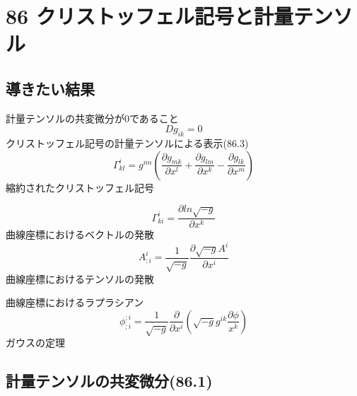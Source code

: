 \documentclass{jsarticle}
\begin{document}
\section{86 クリストッフェル記号と計量テンソル}

\subsection{導きたい結果}

計量テンソルの共変微分が0であること
\begin{equation}
    Dg_{ik} = 0 \label{eq:Dg}
\end{equation}
クリストッフェル記号の計量テンソルによる表示(86.3)
\begin{equation}
    \Gamma^{i}_{kl} =
    g^{im} 
    \left(
    \frac{\partial{g_{mk}}}{\partial{x^{l}}}
     +
    \frac{\partial{g_{lm}}}{\partial{x^{k}}}
     -
    \frac{\partial{g_{lk}}}{\partial{x^{m}}}
    \right)
\end{equation}
縮約されたクリストッフェル記号

\begin{equation}
    \Gamma^{i}_{ki} =
    \frac{\partial{ln\sqrt{-g}}}{\partial{x^{k}}}
\end{equation}
曲線座標におけるベクトルの発散
\begin{equation}
    A^{i}_{;i} = 
    \frac{1}{\sqrt{-g}}\frac{\partial \sqrt{-g}A^{i}}{\partial{x^{i}}}
\end{equation}
曲線座標におけるテンソルの発散


曲線座標におけるラプラシアン
\begin{equation}
    \phi^{;i}_{;i} = 
    \frac{1}{\sqrt{-g}}
    \frac{\partial}{\partial{x^{i}}}
    \left(
        \sqrt{-g}g^{ik} \frac{\partial\phi}{x^{k}}
    \right)
\end{equation}
ガウスの定理

\subsection{計量テンソルの共変微分(86.1)}
\end{document}
